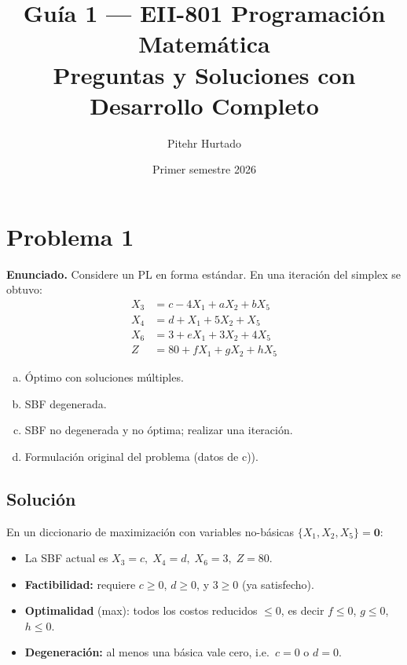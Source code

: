 \documentclass{article}
\title{\textbf{Guía 1 --- EII-801 Programación Matemática\\[4pt]
\large Preguntas y Soluciones con Desarrollo Completo}}
\author{Pitehr Hurtado}
\date{Primer semestre 2026}
\begin{document}
\maketitle
\tableofcontents
\newpage

\section*{Problema 1}

\textbf{Enunciado.} Considere un PL en forma estándar. En una iteración del simplex se obtuvo:
$$\begin{aligned}
X_3 &= c - 4X_1 + aX_2 + bX_5 \\
X_4 &= d + X_1 + 5X_2 + X_5 \\
X_6 &= 3 + eX_1 + 3X_2 + 4X_5 \\
Z   &= 80 + fX_1 + gX_2 + hX_5
\end{aligned}$$

\begin{enumerate}[a)]
\item Óptimo con soluciones múltiples.
\item SBF degenerada.
\item SBF no degenerada y no óptima; realizar una iteración.
\item Formulación original del problema (datos de c)).
\end{enumerate}

\subsection*{Solución}

En un diccionario de maximización con variables no-básicas $\{X_1,X_2,X_5\}=\mathbf{0}$:
\begin{itemize}
  \item La SBF actual es $X_3=c,\;X_4=d,\;X_6=3,\;Z=80$.
  \item \textbf{Factibilidad:} requiere $c\geq0$, $d\geq0$, y $3\geq0$ (ya satisfecho).
  \item \textbf{Optimalidad} (max): todos los costos reducidos $\leq0$, es decir $f\leq0$, $g\leq0$, $h\leq0$.
  \item \textbf{Degeneración:} al menos una básica vale cero, i.e.\ $c=0$ o $d=0$.
\end{itemize}
\end{document}
